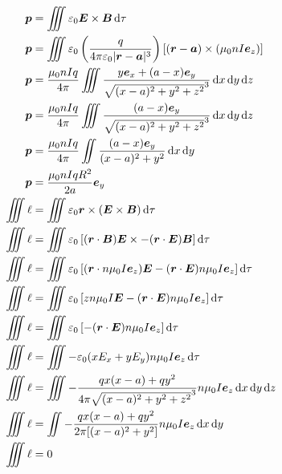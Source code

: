 \begin{align*}
    \boldsymbol{p}&=\iiint\varepsilon_0\boldsymbol E\times\boldsymbol B\dif\tau\\
    \boldsymbol{p}&=\iiint\varepsilon_0\left( \frac{q}{4\pi\varepsilon_0 |\boldsymbol{r} - \boldsymbol{a}|^3} \right) [(\boldsymbol{r} - \boldsymbol{a}) \times (\mu_0 n I \boldsymbol{e}_z)]\\
    \boldsymbol{p}&= \frac{\mu_0 n I q}{4\pi} \iiint\frac{y{\boldsymbol{e}_x} + (a - x){\boldsymbol{e}_y}}{\sqrt{ (x-a)^2 + y^2 + z^2 }^3} \dif x\dif y\dif z\\
    \boldsymbol{p}&= \frac{\mu_0 n I q}{4\pi} \iiint\frac{(a - x){\boldsymbol{e}_y}}{\sqrt{ (x-a)^2 + y^2 + z^2 }^3} \dif x\dif y\dif z\\
    \boldsymbol{p}&= \frac{\mu_0 n I q}{4\pi} \iint\frac{(a - x){\boldsymbol{e}_y}}{ (x-a)^2 + y^2} \dif x\dif y\\
    \boldsymbol{p}&= \frac{\mu_0 n I qR^2}{2a}\boldsymbol{e}_y\\
    \iiint\ell&=\iiint\varepsilon_0\boldsymbol{r}\times(\boldsymbol E\times\boldsymbol B)\dif\tau\\
    \iiint\ell&=\iiint\varepsilon_0\left[(\boldsymbol{r}\cdot\boldsymbol B)\boldsymbol E\times
    -(\boldsymbol{r}\cdot\boldsymbol E)\boldsymbol B\right]\dif\tau\\
    \iiint\ell&=\iiint\varepsilon_0\left[(\boldsymbol{r}\cdot n\mu_0I\boldsymbol{e}_z)\boldsymbol E
    -(\boldsymbol{r}\cdot\boldsymbol E)n\mu_0I\boldsymbol{e}_z\right]\dif\tau\\
    \iiint\ell&=\iiint\varepsilon_0\left[z n\mu_0I\boldsymbol E
    -(\boldsymbol{r}\cdot\boldsymbol E)n\mu_0I\boldsymbol{e}_z\right]\dif\tau\\
    \iiint\ell&=\iiint\varepsilon_0\left[
    -(\boldsymbol{r}\cdot\boldsymbol E)n\mu_0I\boldsymbol{e}_z\right]\dif\tau\\
    \iiint\ell&=\iiint-\varepsilon_0
    (xE_x+yE_y)n\mu_0I\boldsymbol{e}_z\dif\tau\\
    \iiint\ell&=\iiint-
    \frac{qx(x-a)+qy^2}{4\pi\sqrt{(x-a)^2+y^2+z^2}^3}
    n\mu_0I\boldsymbol{e}_z\dif x\dif y\dif z\\
    \iiint\ell&=\iint-
    \frac{qx(x-a)+qy^2}{2\pi[(x-a)^2+y^2]}
    n\mu_0I\boldsymbol{e}_z\dif x\dif y\\
    \iiint\ell&=0
\end{align*}

\newpage